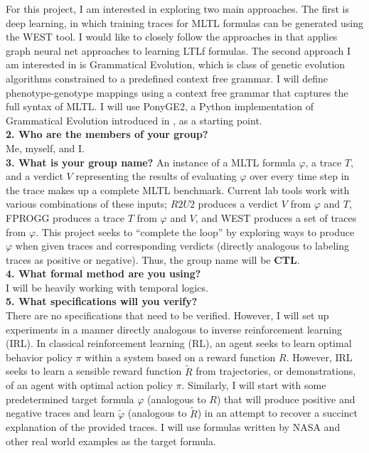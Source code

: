 \documentclass[12pt]{article}
\renewcommand{\phi}{\varphi}
\begin{document}
For this project, I am interested in exploring two main approaches. The first is deep learning, in which training traces for MLTL formulas can be generated using the WEST tool. I would like to closely follow the approaches in \cite{Luo_Liang_Du_Wan_Peng_Zhang_2022} that applies graph neural net approaches to learning LTLf formulas. The second approach I am interested in is Grammatical Evolution, which is class of genetic evolution algorithms constrained to a predefined context free grammar. I will define phenotype-genotype mappings using a context free grammar that captures the full syntax of MLTL. I will use PonyGE2, a Python implementation of Grammatical Evolution introduced in \cite{ponyge2}, as a starting point. 
\\

\noindent \textbf{2. Who are the members of your group?}\\
Me, myself, and I.\\

\noindent \textbf{3. What is your group name?}
An instance of a MLTL formula $\phi$, a trace $T$, and a verdict $V$ representing the results of evaluating $\phi$ over every time step in the trace makes up a complete MLTL benchmark. Current lab tools work with various combinations of these inputs; $R2U2$ produces a verdict $V$ from $\phi$ and $T$, FPROGG produces a trace $T$ from $\phi$ and $V$, and WEST produces a set of traces from $\phi$. This project seeks to ``complete the loop'' by exploring ways to produce $\phi$ when given traces and corresponding verdicts (directly analogous to labeling traces as positive or negative). Thus, the group name will be \textbf{CTL}.\\

\noindent \textbf{4. What formal method are you using?} \\
I will be heavily working with temporal logics. \\

\noindent \textbf{5. What specifications will you verify?} \\
There are no specifications that need to be verified. However, I will set up experiments in a manner directly analogous to inverse reinforcement learning (IRL). In classical reinforcement learning (RL), an agent seeks to learn optimal behavior policy $\pi$ within a system based on a reward function $R$. However, IRL seeks to learn a sensible reward function $\tilde{R}$ from trajectories, or demonstrations, of an agent with optimal action policy $\pi
$. Similarly, I will start with some predetermined target formula $\phi$ (analogous to $R$) that will produce positive and negative traces and learn $\tilde{\phi}$ (analogous to $\tilde{R}$) in an attempt to recover a succinct explanation of the provided traces.
I will use formulas written by NASA and other real world examples as the target formula. \\
\end{document}
